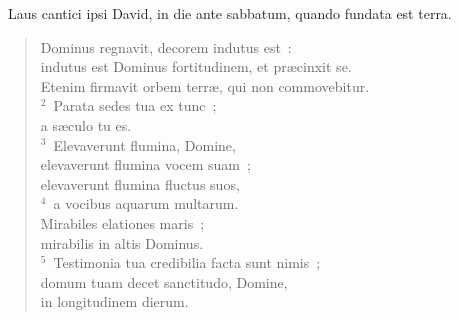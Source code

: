 ~\lettrine[lines=10,image=true,loversize=0.05,lraise=-0.03]{L}{}aus cantici ipsi David, in die ante sabbatum, quando fundata est terra. \begin{flushleft}\begin{verse}\vspace{6pt}Dominus regnavit, decorem indutus est~:\\ indutus est Dominus fortitudinem, et pr\ae cinxit se.\\ Etenim firmavit orbem terr\ae , qui non commovebitur.\\
${}^{2}$~Parata sedes tua ex tunc~;\\ a s\ae culo tu es.\\
${}^{3}$~Elevaverunt flumina, Domine,\\ elevaverunt flumina vocem suam~;\\ elevaverunt flumina fluctus suos,\\
${}^{4}$~a vocibus aquarum multarum.\\ Mirabiles elationes maris~;\\ mirabilis in altis Dominus.\\
${}^{5}$~Testimonia tua credibilia facta sunt nimis~;\\ domum tuam decet sanctitudo, Domine,\\ in longitudinem dierum.\end{verse}\end{flushleft}


